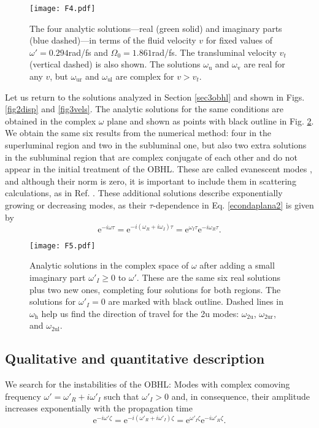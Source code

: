 \documentclass[aps,pra,reprint,amsmath,amssymb,showpacs,groupedaddress,floatfix]{revtex4-1}
\begin{document}
\begin{figure}
	\centering
	\texttt{[image: F4.pdf]}
	\caption{The four analytic solutions---real (green solid) and imaginary parts (blue dashed)---in terms of the fluid velocity $v$ for fixed values of $\omega'=0.294$rad/fs and $\Omega_0=1.861$rad/fs. The transluminal velocity $v_t$ (vertical dashed) is also shown. The solutions $\omega_{\text{u}}$ and $\omega_{\text{v}}$ are real for any $v$, but $\omega_\text{ur}$ and $\omega_\text{ul}$ are complex for $v>v_t$.}
	\label{fig4sols}
\end{figure}

Let us return to the solutions analyzed in Section \ref{sec3obhl} and shown in Figs. \ref{fig2disp} and \ref{fig3vels}. The analytic solutions for the same conditions are obtained in the complex $\omega$ plane and shown as points with black outline in Fig. \ref{fig5cspace}. We obtain the same six results from the numerical method: four in the superluminal region and two in the subluminal one, but also two extra solutions in the subluminal region that are complex conjugate of each other and do not appear in the initial treatment of the OBHL. These are called evanescent modes \cite{Larre2012, Mathieu2017}, and although their norm is zero, it is important to include them in scattering calculations, as in Ref. \cite{Isoard2020}. These additional solutions describe exponentially growing or decreasing modes, as their $\tau$-dependence in Eq. \eqref{econdaplana2} is given by
\begin{equation}\label{complex}
\text{e}^{-i\omega \tau}=\text{e}^{-i(\omega_R+i\omega_I)\tau}=\text{e}^{\omega_I\tau}\text{e}^{-i\omega_R\tau}.
\end{equation}

\begin{figure}\centering
	\texttt{[image: F5.pdf]}
	\caption{Analytic solutions in the complex space of $\omega$ after adding a small imaginary part $\omega'_I\ge 0$ to $\omega'$. These are the same six real solutions plus two new ones, completing four solutions for both regions. The solutions for $\omega'_I= 0$ are marked with black outline. Dashed lines in $\omega_\text{h}$ help us find the direction of travel for the 2u modes: $\omega_\text{2u}$, $\omega_\text{2ur}$, and $\omega_\text{2ul}$.}
	\label{fig5cspace}
\end{figure}

\subsection{Qualitative and quantitative description}
We search for the instabilities of the OBHL: Modes with complex comoving frequency $\omega'=\omega'_R+i\omega'_I$ such that $\omega'_I>0$ and, in consequence, their amplitude increases exponentially with the propagation time
\begin{equation}\label{exps}
\text{e}^{-i\omega' \zeta}=\text{e}^{-i(\omega'_R+i\omega'_I)\zeta}=\text{e}^{\omega'_I\zeta}\text{e}^{-i\omega'_R\zeta}.
\end{equation}
\end{document}

